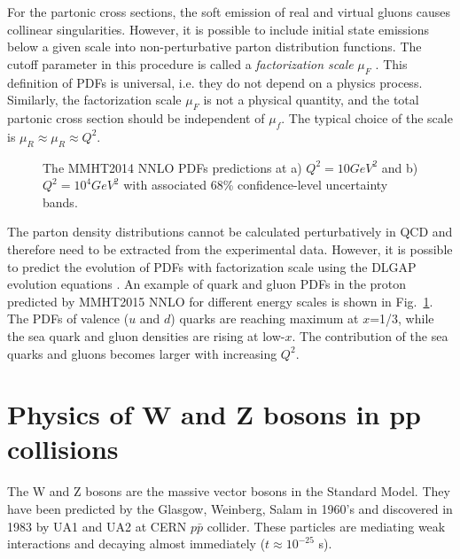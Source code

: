 For the partonic cross sections, the soft emission of real and virtual gluons causes collinear singularities. However, it is possible to include initial state emissions below a given scale into non-perturbative parton distribution functions.  The cutoff parameter in this procedure is called a \textit{factorization scale} $\mu_F$ \cite{factscale}. This definition of PDFs is universal, i.e. they do not depend on a physics process. Similarly, the factorization scale $\mu_F$ is not a physical quantity, and the total partonic cross section should be independent of $\mu_f$. The typical choice of the scale is $\mu_R \approx \mu_R \approx Q^2$.

\begin{figure}[!tb]
\begin{minipage}[h]{0.4\linewidth}
\end{minipage}
\hfill
\begin{minipage}[h]{0.4\linewidth}
\end{minipage}
\caption{The MMHT2014 NNLO PDFs predictions at a) $Q^2 = 10 GeV^2$ and b) $Q^2 = 10^4 GeV^2$ with associated 68\% confidence-level uncertainty bands\cite{MMHT}.}
\label{fig:PFSMMHT}
\end{figure}

The parton density distributions cannot be calculated perturbatively in QCD and therefore need to be extracted from the experimental data. However, it is possible to predict the evolution of PDFs with factorization scale using the DLGAP evolution equations \cite{Gribov:1972ri}. An example of quark and gluon PDFs in the proton predicted by MMHT2015 NNLO\cite{MMHT} for different energy scales is shown in Fig.~\ref{fig:PFSMMHT}. The PDFs of valence ($u$ and $d$) quarks are reaching maximum at $x$=1/3, while the sea quark and gluon densities are rising at low-$x$. The contribution of the sea quarks and gluons becomes larger with increasing $Q^2$.



\section{Physics of W and Z bosons in pp collisions}\label{sec:TheoWZ}

The W and Z bosons are the massive vector bosons in the Standard Model.
They have been predicted by the Glasgow, Weinberg, Salam in 1960's\cite{SM1, SM2, SM3} and discovered in 1983 by UA1 and UA2 at CERN $p\bar{p}$ collider\cite{Wdisc1, Wdisc2, Wdisc3, Wdisc4}.  These particles are mediating weak interactions and decaying almost immediately ($t \approx 10^{-25}$ s). 

